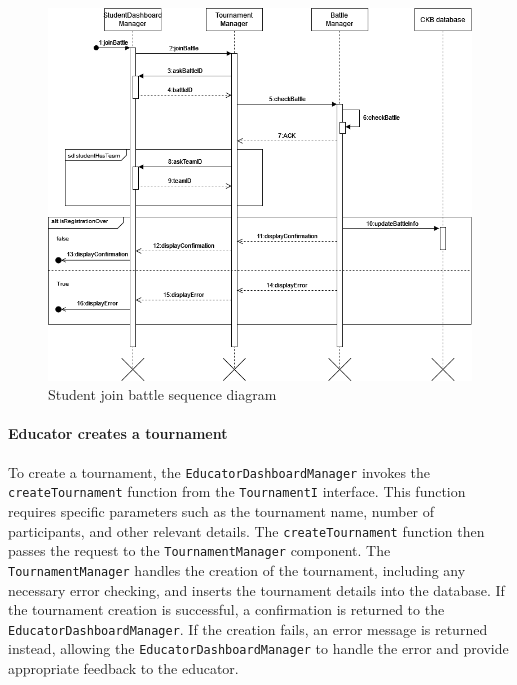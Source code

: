 \begin{figure}[H]
    \begin{center}
        \includegraphics[width=\linewidth]{Images/sequence/Sd_joinBattle.png}
        \caption{Student join battle sequence diagram}
        \label{fig:student_join_battle}
    \end{center}
\end{figure}

\paragraph{Educator creates a tournament}
To create a tournament, the \verb|EducatorDashboardManager| invokes the \verb|createTournament| function from the \verb|TournamentI| interface. 
This function requires specific parameters such as the tournament name, number of participants, and other relevant details. The \verb|createTournament| function then passes the request to the \verb|TournamentManager| component. 
The \verb|TournamentManager| handles the creation of the tournament, including any necessary error checking, and inserts the tournament details into the database. If the tournament creation is successful, a confirmation is returned to the \verb|EducatorDashboardManager|. 
If the creation fails, an error message is returned instead, allowing the \verb|EducatorDashboardManager| to handle the error and provide appropriate feedback to the educator.

